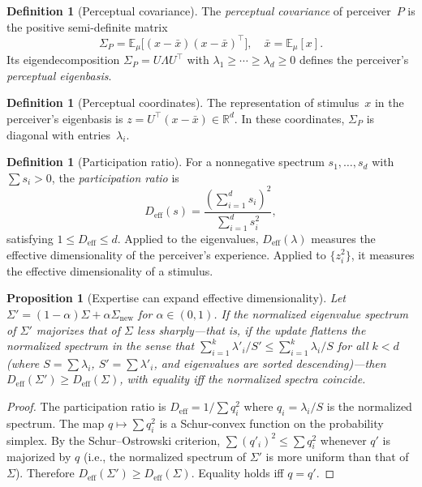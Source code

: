 \documentclass[journal]{IEEEtran}
\newtheorem{proposition}[theorem]{Proposition}
\theoremstyle{definition}
\newtheorem{definition}[theorem]{Definition}
\theoremstyle{remark}
\newcommand{\R}{\mathbb{R}}
\newcommand{\E}{\mathbb{E}}
\begin{document}
\begin{definition}[Perceptual covariance]
\label{def:cov}
The \emph{perceptual covariance} of perceiver~$P$ is the positive
semi-definite matrix
\begin{equation}
    \Sigma_P = \E_\mu\bigl[(x - \bar{x})(x - \bar{x})^\top\bigr],
    \quad \bar{x} = \E_\mu[x].
    \label{eq:cov}
\end{equation}
Its eigendecomposition $\Sigma_P = U \Lambda U^\top$ with
$\lambda_1 \geq \cdots \geq \lambda_d \geq 0$ defines the
perceiver's \emph{perceptual eigenbasis}.
\end{definition}

\begin{definition}[Perceptual coordinates]
\label{def:coords}
The representation of stimulus~$x$ in the perceiver's eigenbasis is
$z = U^\top(x - \bar{x}) \in \R^d$.  In these coordinates,
$\Sigma_P$ is diagonal with entries~$\lambda_i$.
\end{definition}

\begin{definition}[Participation ratio]
\label{def:pr}
For a nonnegative spectrum $s_1, \ldots, s_d$ with $\sum s_i > 0$,
the \emph{participation ratio} is
\begin{equation}
    D_{\mathrm{eff}}(s) = \frac{(\sum_{i=1}^d s_i)^2}
    {\sum_{i=1}^d s_i^2},
    \label{eq:pr}
\end{equation}
satisfying $1 \leq D_{\mathrm{eff}} \leq d$.  Applied to the
eigenvalues, $D_{\mathrm{eff}}(\lambda)$ measures the effective
dimensionality of the perceiver's experience.  Applied to
$\{z_i^2\}$, it measures the effective dimensionality of a stimulus.
\end{definition}

\begin{proposition}[Expertise can expand effective dimensionality]
\label{prop:expertise}
Let $\Sigma' = (1-\alpha)\Sigma + \alpha \Sigma_{\mathrm{new}}$
for $\alpha \in (0,1)$.  If the normalized eigenvalue spectrum of
$\Sigma'$ majorizes that of $\Sigma$ less sharply---that is, if the
update \emph{flattens} the normalized spectrum in the sense that
$\sum_{i=1}^k \lambda'_i / S' \leq \sum_{i=1}^k \lambda_i / S$
for all $k < d$ (where $S = \sum \lambda_i$, $S' = \sum \lambda'_i$,
and eigenvalues are sorted descending)---then
$D_{\mathrm{eff}}(\Sigma') \geq D_{\mathrm{eff}}(\Sigma)$,
with equality iff the normalized spectra coincide.
\end{proposition}

\begin{proof}
The participation ratio is $D_{\mathrm{eff}} = 1 / \sum q_i^2$
where $q_i = \lambda_i / S$ is the normalized spectrum.  The map
$q \mapsto \sum q_i^2$ is a Schur-convex function on the probability
simplex.  By the Schur--Ostrowski criterion, $\sum (q'_i)^2 \leq
\sum q_i^2$ whenever $q'$ is majorized by $q$ (i.e., the
normalized spectrum of $\Sigma'$ is more uniform than that of
$\Sigma$).  Therefore $D_{\mathrm{eff}}(\Sigma') \geq
D_{\mathrm{eff}}(\Sigma)$.  Equality holds iff $q = q'$.
\end{proof}
\end{document}
